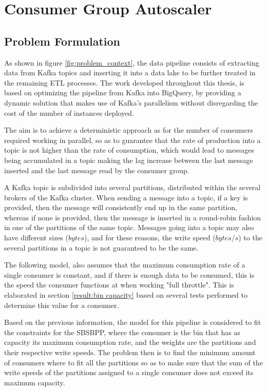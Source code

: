 \chapter{Consumer Group Autoscaler} \label{chap:consumer_group_autoscaler}

\section{Problem Formulation}

As shown in figure \ref{fig:problem_context}, the data pipeline consists of
extracting data from Kafka topics and inserting it into a data lake to be
further treated in the remaining ETL processes.  The work developed throughout
this thesis, is based on optimizing the pipeline from Kafka into BigQuery, by
providing a dynamic solution that makes use of Kafka's parallelism without
disregarding the cost of the number of instances deployed. 

The aim is to achieve a deterministic approach as for the number of consumers
required working in parallel, so as to guarantee that the rate of production
into a topic is not higher than the rate of consumption, which would lead to
messages being accumulated in a topic making the lag increase between the last
message inserted and the last message read by the consumer group.

A Kafka topic is subdivided into several partitions, distributed within the
several brokers of the Kafka cluster. When sending a message into a topic, if a
key is provided, then the message will consistently end up in the same
partition, whereas if none is provided, then the message is inserted in a
round-robin fashion in one of the partitions of the same topic. Messages going
into a topic may also have different sizes ($bytes$), and for these reasons, the
write speed ($bytes/s$) to the several partitions in a topic is not guaranteed
to be the same. 

The following model, also assumes that the maximum consumption rate of a single
consumer is constant, and if there is enough data to be consumed, this is the
speed the consumer functions at when working "full throttle". This is
elaborated in section \ref{result:bin capacity} based on several tests performed
to determine this value for a consumer. 

Based on the previous information, the model for this pipeline is considered to
fit the constraints for the SBSBPP, where the consumer is the bin that has as
capacity its maximum consumption rate, and the weights are the partitions and
their respective write speeds. The problem then is to find the minimum amount of
consumers where to fit all the partitions so as to make sure that the sum of the
write speeds of the partitions assigned to a single consumer does not exceed its
maximum capacity. 

